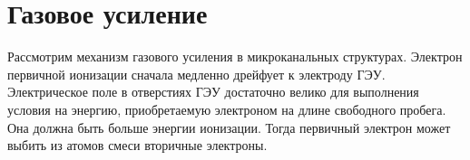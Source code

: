 \section{Газовое усиление}
\label{sec:gas_ampl}
Рассмотрим механизм газового усиления в микроканальных структурах. Электрон первичной ионизации сначала медленно дрейфует к электроду ГЭУ. Электрическое поле в отверстиях ГЭУ достаточно велико для выполнения условия на энергию, приобретаемую электроном на длине свободного пробега. Она должна быть больше энергии ионизации. Тогда первичный электрон может выбить из атомов смеси вторичные электроны.\par

